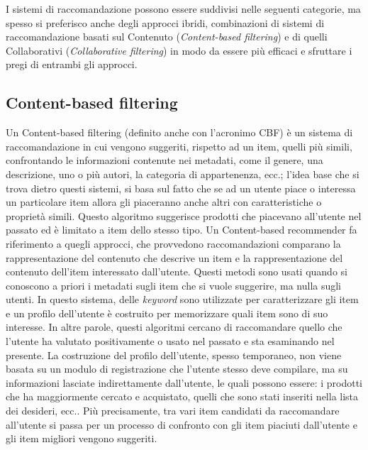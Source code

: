 I sistemi di raccomandazione possono essere suddivisi nelle seguenti categorie, ma spesso si preferisco anche degli approcci ibridi, 
combinazioni di sistemi di raccomandazione basati sul Contenuto (\textit{Content-based filtering}) e di 
quelli Collaborativi (\textit{Collaborative filtering}) in modo da essere più efficaci e sfruttare i pregi di entrambi gli approcci.
%
\subsection{Content-based filtering}
Un Content-based filtering (definito anche con l'acronimo CBF) è un sistema di raccomandazione in cui vengono suggeriti, rispetto ad un item, quelli 
più simili, confrontando le informazioni contenute nei metadati, come il genere, una descrizione, uno o più autori, la categoria di 
appartenenza, ecc.; l'idea base che si trova dietro questi sistemi, si basa sul fatto che se ad un utente piace o interessa un particolare 
item allora gli piaceranno anche altri con caratteristiche o proprietà simili.\hfill\break
Questo algoritmo suggerisce prodotti che piacevano all'utente nel passato ed è limitato a item dello stesso tipo. Un 
Content-based recommender fa riferimento a quegli approcci, che provvedono raccomandazioni comparano la rappresentazione del 
contenuto che descrive un item e la rappresentazione del contenuto dell'item interessato dall'utente.\hfill\break
Questi metodi sono usati quando si conoscono a priori i metadati sugli item che si vuole suggerire, ma nulla sugli utenti.
In questo sistema, delle \textit{keyword} sono utilizzate per caratterizzare gli item e un profilo dell'utente è 
costruito per memorizzare quali item sono di suo interesse. In altre parole, questi algoritmi cercano di raccomandare quello che 
l'utente ha valutato positivamente o usato nel passato e sta esaminando nel presente. La costruzione del profilo dell'utente, 
spesso temporaneo, non viene basata su un modulo di registrazione che l'utente stesso deve compilare, ma su informazioni 
lasciate indirettamente dall'utente, le quali possono essere: i prodotti che ha maggiormente cercato e acquistato, quelli che sono 
stati inseriti nella lista dei desideri, ecc.. Più precisamente, tra vari item candidati da raccomandare all'utente si passa per un 
processo di confronto con gli item piaciuti dall'utente e gli item migliori vengono suggeriti.
%
